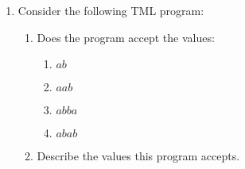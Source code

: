 \documentclass[answers]{exam}
\begin{document}
\begin{enumerate}
        \item Consider the following TML program:
        
        \begin{enumerate}
            \item Does the program accept the values:
            \begin{enumerate}
                \item $ab$
                \begin{solution}
                    
                \end{solution}
                \newpage
                
                \item $aab$
                \begin{solution}
                    
                \end{solution}
                
                \item $abba$
                \begin{solution}
                    
                \end{solution}
                
                \item $abab$
                \begin{solution}
                    
                \end{solution}
            \end{enumerate}
            
            \item Describe the values this program accepts.
            \begin{solution}
                \vspace*{30pt}
            \end{solution}
        \end{enumerate}
    \end{enumerate}
    
    \newpage
\end{document}
